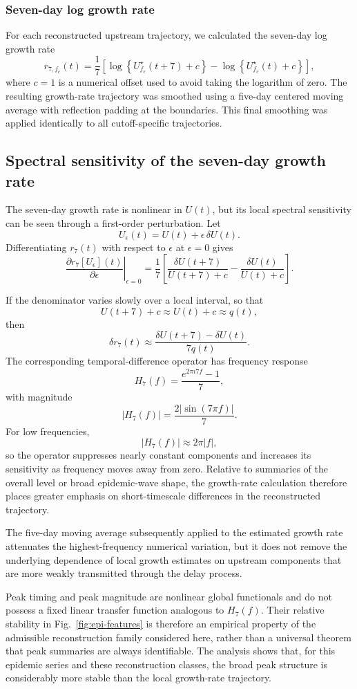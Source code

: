 \subsubsection{Seven-day log growth rate}
\label{sec:appendix_growth_rate}

For each reconstructed upstream trajectory, we calculated the seven-day log
growth rate
\[
r_{7,f_c}(t)
=
\frac{1}{7}
\left[
\log\left\{
U^\star_{f_c}(t+7)+c
\right\}
-
\log\left\{
U^\star_{f_c}(t)+c
\right\}
\right],
\]
where \(c=1\) is a numerical offset used to avoid taking the logarithm of zero.
The resulting growth-rate trajectory was smoothed using a five-day centered
moving average with reflection padding at the boundaries. This final
smoothing was applied identically to all cutoff-specific trajectories.


\subsection{Spectral sensitivity of the seven-day growth rate}
\label{sec:appendix_growth_spectral}

The seven-day growth rate is nonlinear in \(U(t)\), but its local spectral
sensitivity can be seen through a first-order perturbation. Let
\[
U_\epsilon(t)
=
U(t)+\epsilon\,\delta U(t).
\]
Differentiating \(r_7(t)\) with respect to \(\epsilon\) at \(\epsilon=0\)
gives
\[
\left.
\frac{\partial r_7[U_\epsilon](t)}
{\partial\epsilon}
\right|_{\epsilon=0}
=
\frac{1}{7}
\left[
\frac{\delta U(t+7)}
{U(t+7)+c}
-
\frac{\delta U(t)}
{U(t)+c}
\right].
\]

If the denominator varies slowly over a local interval, so that
\[
U(t+7)+c
\approx
U(t)+c
\approx
q(t),
\]
then
\[
\delta r_7(t)
\approx
\frac{
\delta U(t+7)-\delta U(t)
}{
7q(t)
}.
\]
The corresponding temporal-difference operator has frequency response
\[
H_7(f)
=
\frac{
e^{2\pi i 7f}-1
}{7},
\]
with magnitude
\[
|H_7(f)|
=
\frac{
2|\sin(7\pi f)|
}{7}.
\]
For low frequencies,
\[
|H_7(f)|
\approx
2\pi |f|,
\]
so the operator suppresses nearly constant components and increases its
sensitivity as frequency moves away from zero. Relative to summaries of the
overall level or broad epidemic-wave shape, the growth-rate calculation
therefore places greater emphasis on short-timescale differences in the
reconstructed trajectory.

The five-day moving average subsequently applied to the estimated growth rate
attenuates the highest-frequency numerical variation, but it does not remove
the underlying dependence of local growth estimates on upstream components
that are more weakly transmitted through the delay process.


Peak timing and peak magnitude are nonlinear global functionals and do not
possess a fixed linear transfer function analogous to \(H_7(f)\). Their
relative stability in Fig.~\ref{fig:epi-features} is therefore an empirical
property of the admissible reconstruction family considered here, rather than
a universal theorem that peak summaries are always identifiable. The analysis
shows that, for this epidemic series and these reconstruction classes, the
broad peak structure is considerably more stable than the local growth-rate
trajectory.